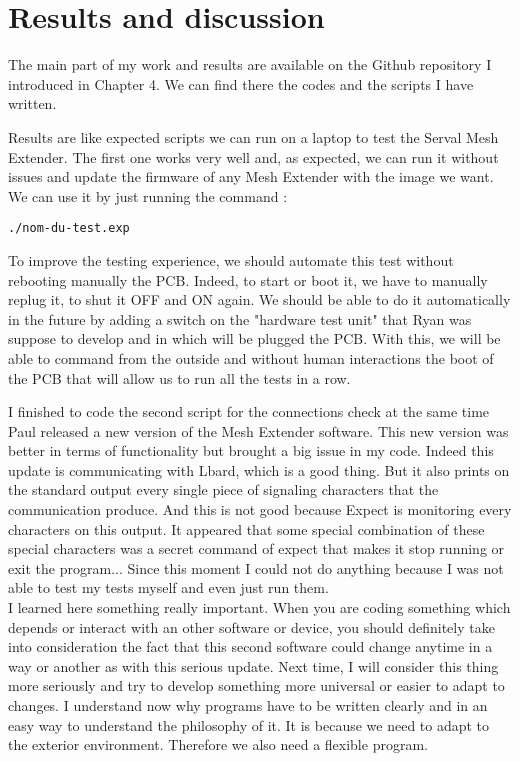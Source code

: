 \chapter{Results and discussion}

The main part of my work and results are available on the Github repository I introduced in Chapter 4. We can find there the codes and the scripts I have written.
\par
Results are like expected scripts we can run on a laptop to test the Serval Mesh Extender. The first one works very well and, as expected, we can run it without issues and update the firmware of any Mesh Extender with the image we want. We can use it by just running the command :
\begin{lstlisting}
./nom-du-test.exp
\end{lstlisting}
To improve the testing experience, we should automate this test without rebooting manually the PCB. Indeed, to start or boot it, we have to manually replug it, to shut it OFF and ON again. We should be able to do it automatically in the future by adding a switch on the "hardware test unit" that Ryan was suppose to develop and in which will be plugged the PCB. With this, we will be able to command from the outside and without human interactions the boot of the PCB that will allow us to run all the tests in a row. 

\par
I finished to code the second script for the connections check at the same time Paul released a new version of the Mesh Extender software. This new version was better in terms of functionality but brought a big issue in my code. Indeed this update is communicating with Lbard, which is a good thing. But it also prints on the standard output every single piece of signaling characters that the communication produce. And this is not good because Expect is monitoring every characters on this output. It appeared that some special combination of these special characters was a secret command of expect that makes it stop running or exit the program... Since this moment I could not do anything because I was not able to test my tests myself and even just run them. 
\\
I learned here something really important. When you are coding something which depends or interact with an other software or device, you should definitely take into consideration the fact that this second software could change anytime in a way or another as with this serious update. Next time, I will consider this thing more seriously and try to develop something more universal or easier to adapt to changes. I understand now why programs have to be written clearly and in an easy way to understand the philosophy of it. It is because we need to adapt to the exterior environment. Therefore we also need a flexible program. 

